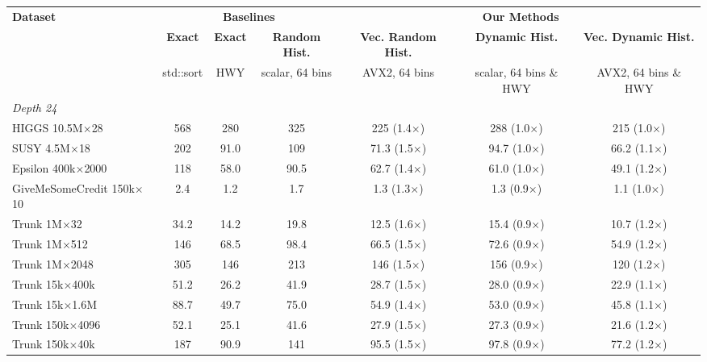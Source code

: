 \begin{table}[p]
    \centering
    \ContinuedFloat
    \footnotesize
    \setlength{\tabcolsep}{4pt}
    \begin{tabular}{l|ccc|ccc}
        \hline
        \multirow{3}{*}{\textbf{Dataset}} & \multicolumn{3}{c|}{\textbf{Baselines}} & \multicolumn{3}{c}{\textbf{Our Methods}} \\
         & \textbf{Exact} & \textbf{Exact} & \textbf{Random Hist.} & \textbf{Vec. Random Hist.} & \textbf{Dynamic Hist.} & \textbf{Vec. Dynamic Hist.} \\
         & \scriptsize std::sort & \scriptsize HWY & \scriptsize scalar, 64 bins & \scriptsize AVX2, 64 bins & \scriptsize scalar, 64 bins \& HWY & \scriptsize AVX2, 64 bins \& HWY \\
        \hline
        \multicolumn{7}{l}{\textit{Depth 24}} \\
        HIGGS 10.5M$\times$28 & 568 & 280 & 325 & 225 (1.4$\times$) & 288 (1.0$\times$) & 215 (1.0$\times$) \\
        SUSY 4.5M$\times$18 & 202 & 91.0 & 109 & 71.3 (1.5$\times$) & 94.7 (1.0$\times$) & 66.2 (1.1$\times$) \\
        Epsilon 400k$\times$2000 & 118 & 58.0 & 90.5 & 62.7 (1.4$\times$) & 61.0 (1.0$\times$) & 49.1 (1.2$\times$) \\
        GiveMeSomeCredit 150k$\times$10 & 2.4 & 1.2 & 1.7 & 1.3 (1.3$\times$) & 1.3 (0.9$\times$) & 1.1 (1.0$\times$) \\
        Trunk 1M$\times$32 & 34.2 & 14.2 & 19.8 & 12.5 (1.6$\times$) & 15.4 (0.9$\times$) & 10.7 (1.2$\times$) \\
        Trunk 1M$\times$512 & 146 & 68.5 & 98.4 & 66.5 (1.5$\times$) & 72.6 (0.9$\times$) & 54.9 (1.2$\times$) \\
        Trunk 1M$\times$2048 & 305 & 146 & 213 & 146 (1.5$\times$) & 156 (0.9$\times$) & 120 (1.2$\times$) \\
        Trunk 15k$\times$400k & 51.2 & 26.2 & 41.9 & 28.7 (1.5$\times$) & 28.0 (0.9$\times$) & 22.9 (1.1$\times$) \\
        Trunk 15k$\times$1.6M & 88.7 & 49.7 & 75.0 & 54.9 (1.4$\times$) & 53.0 (0.9$\times$) & 45.8 (1.1$\times$) \\
        Trunk 150k$\times$4096 & 52.1 & 25.1 & 41.6 & 27.9 (1.5$\times$) & 27.3 (0.9$\times$) & 21.6 (1.2$\times$) \\
        Trunk 150k$\times$40k & 187 & 90.9 & 141 & 95.5 (1.5$\times$) & 97.8 (0.9$\times$) & 77.2 (1.2$\times$) \\

\end{tabular}
\end{table}
